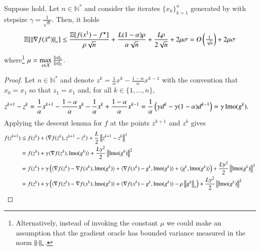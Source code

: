 \begin{toappendix}
\begin{lemmarep}
    Suppose  hold. Let $n\in\mathbb{N}^*$ and consider the iterates $\{x_k\}_{k=1}^n$ generated by  with stepsize $\gamma = \frac{1}{\sqrt{n}}$. Then, it holds
    \begin{equation*}
        \mathbb{E}[\left\Vert{\nabla f(\bar{x}^n)}\right\Vert_{\ast}] \leq \frac{\mathbb{E}[f(x^1)-f^\star]}{\rho\sqrt{n}} + \frac{L(1-\alpha)\rho}{\alpha\sqrt{n}} + \frac{L\rho}{2\sqrt{n}} + 2\mu\sigma = O\left(\tfrac{1}{\sqrt{n}}\right) + 2\mu\sigma
    \end{equation*}
    where\footnote{Alternatively, instead of invoking the constant $\mu$ we could make an assumption that the gradient oracle has bounded variance measured in the norm $\left\Vert{\cdot}\right\Vert_{\ast}$.} $\mu = \max\limits_{x\in\mathcal{X}}\frac{\left\Vert{x}\right\Vert_\ast}{\left\Vert{x}\right\Vert_{2}}$.
\end{lemmarep}
\begin{proof}
    Let $n\in\mathbb{N}^*$ and denote $z^{k} = \tfrac{1}{\alpha}x^k-\tfrac{1-\alpha}{\alpha}x^{k-1}$ with the convention that $x_0 = x_1$ so that $z_1 = x_1$ and, for all $k\in\{1,\ldots,n\}$,
    \begin{equation*}
        \begin{aligned}
            z^{k+1} - z^k
                &= \frac{1}{\alpha}x^{k+1}-\frac{1-\alpha}{\alpha}x^{k}-\frac{1}{\alpha}x^{k}+\frac{1-\alpha}{\alpha}x^{k-1}= \frac{1}{\alpha}\left(\gamma d^{k} - \gamma (1-\alpha)d^{k-1}\right)= \gamma\operatorname{lmo}(g^k).
        \end{aligned}
    \end{equation*}
    Applying the descent lemma for $f$ at the points $z^{k+1}$ and $z^k$ gives
    \begin{equation}\label{eq:nsgd_descent1}
        \begin{aligned}
            f(z^{k+1})
                &\leq f(z^{k}) + \langle \nabla f(z^k), z^{k+1}-z^k\rangle +\frac{L}{2}\norm{z^{k+1}-z^k}^2\\
                &= f(z^{k}) + \gamma\langle \nabla f(z^k), \lmo(g^k)\rangle +\frac{L\gamma^2}{2}\norm{\lmo(g^k)}^2\\
                &= f(z^{k}) + \gamma\left(\langle \nabla f(z^k)-\nabla f(x^k), \lmo(g^k)\rangle + \langle \nabla f(x^k) - g^k,\lmo(g^k)\rangle +\langle g^k,\lmo(g^k)\rangle\right) +\frac{L\gamma^2}{2}\norm{\lmo(g^k)}^2\\
                &= f(z^{k}) + \gamma\left(\langle \nabla f(z^k)-\nabla f(x^k), \lmo(g^k)\rangle + \langle \nabla f(x^k) - g^k,\lmo(g^k)\rangle -\rho\norm{g^k}_{\ast}\right) +\frac{L\gamma^2}{2}\norm{\lmo(g^k)}^2\\

\end{aligned}
\end{equation}
\end{proof}
\end{toappendix}
